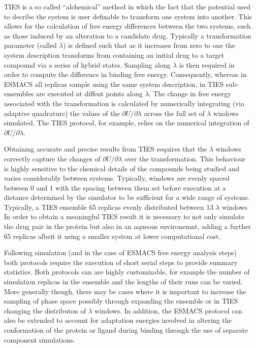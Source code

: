 TIES is a so called ``alchemical'' method in which the fact that the potential used to decribe the system is user definable to transform one
system into another.
This allows for the calculation of free energy differences between the two
systems, such as those induced by an alteration to a candidate drug.
Typically a transformation parameter (called $\lambda$) is defined such that as it increases from zero to one the system description transforms from containing an
initial drug to a target compound via a series of hybrid states.
Sampling along $\lambda$ is then required in order to compute the difference in binding free energy.
Consequently, whereas in ESMACS all replicas sample using the same system description,
in TIES sub-ensembles are executed at diffent points along $\lambda$.
The change in free energy associated with the transformation is calculated by numerically integrating (via adaptive quadrature) the
values of the $\partial U/\partial\lambda$ across the full set of $\lambda$ windows simulated.
The TIES protocol, for example, relies on the numerical
integration of $\partial U/\partial\lambda$. 

Obtaining accurate and precise results from TIES requires that the $\lambda$ windows correctly
capture the changes of $\partial U/\partial\lambda$ over the transformation.
This behaviour is highly sensitive to
the chemical details of the compounds being studied and varies considerably between systems.
Typically, windows are evenly spaced between 0 and 1 with the spacing between them set before
execution at a distance determined by the simulator to be sufficient for a wide range of systems.
Typically, a TIES ensemble 65 replicas evenly distributed between 13 $\lambda$ windows
In order to obtain a meaningful TIES result it is necessary to not only simulate the drug pair
in the protein but also in an aqueous environemnt, adding a further 65 replicas albeit it using a
smaller system at lower computational cost.

Following simulation (and in the case of ESMACS free energy analysis steps) both protocols require
the execution of short serial steps to provide summary statistics.
Both protocols can are highly customizable, for example the number of simulation replicas in the
ensemble and the lengths of their runs can be varied.
More generally though, there may be cases where it is important to increase the sampling of phase
space possibly through expanding the ensemble or in TIES changing the distributon of $\lambda$
windows.
In addition, the ESMACS protocol can also be extended to account for adaptation energies involved
in altering the conformation of the protein or ligand during binding through the use of separate
component simulations.

